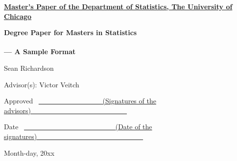 \thispagestyle{empty}
\noindent
\underline{\bf Master's Paper of the Department of Statistics, The
  University of Chicago} 

\vspace{1.8in}
\begin{center}
{\bf\LARGE Degree Paper for Masters in Statistics}
\\~\\
{\bf\Large --- A Sample Format}


\vspace{1.4in}
{\Large Sean Richardson}

\vspace{1.3in}
{\Large Advisor(s): Victor Veitch}

\end{center}

\vspace{.6in}
{\Large Approved} ~\underline{~~~~~~~~~~~~~~~~~~
\small (Signatures of the advisors)~~~~~~~~~~~~~~~~~~~~~~~~~~~~}

\vspace{.2in}
{\Large Date} ~\underline{~~~~~~~~~~~~~~~~~~~~~~~~~~
{\small (Date of the signatures)}~~~~~~~~~~~~~~~~~~~~~~~~~~~~~~~}

\vfill
\begin{center}{\large Month-day, 20xx}\end{center}

\clearpage
